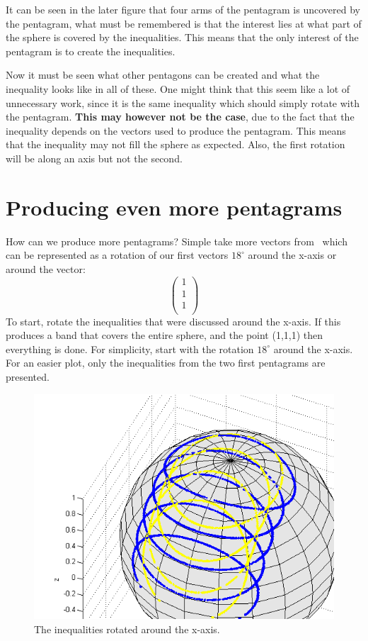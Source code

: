 It can be seen in the later figure that four arms of the pentagram is uncovered by the pentagram, what must be remembered is that the interest lies at what part of the sphere is covered by the inequalities. This means that the only interest of the pentagram is to create the inequalities.


Now it must be seen what other pentagons can be created and what the inequality looks like in all of these.
One might think that this seem like a lot of unnecessary work, since it is the same inequality which should simply rotate with the pentagram. \textbf{This may however not be the case}, due to the fact that the inequality depends on the vectors used to produce the pentagram. This means that the inequality may not fill the sphere as expected. Also, the first rotation will be along an axis but not the second.
\newpage
\section{Producing even more pentagrams}
How can we produce more pentagrams? Simple take more vectors from~\cite{Kochen1968The} which can be represented as a rotation of our first vectors $18^\circ$ around the x-axis or around the vector: 
\begin{equation*}
\begin{pmatrix}
1\\
1\\
1\\
\end{pmatrix}
\end{equation*}
To start, rotate the inequalities that were discussed around the x-axis. If this produces a band that covers the entire sphere, and the point (1,1,1) then everything is done.
For simplicity, start with the rotation $18^\circ$ around the x-axis. For an easier plot, only the inequalities from the two first pentagrams are presented.
\begin{figure}[H]
\begin{center}
\includegraphics[scale=0.5]{ine12all.png}
\caption{The inequalities rotated around the x-axis.}
\label{fig:ine12all}
\end{center}
\end{figure}
